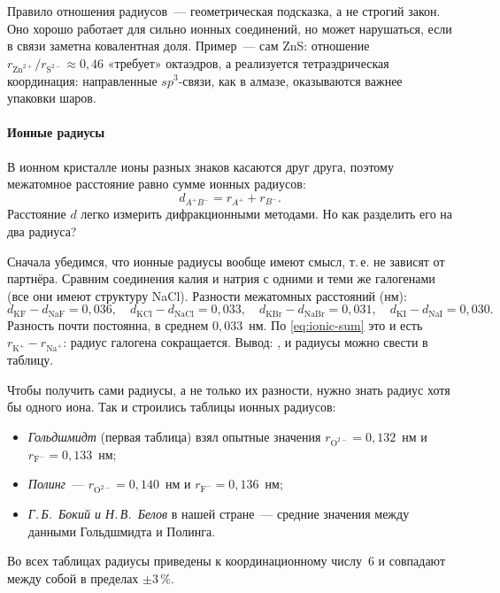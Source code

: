 \begin{vnimanie}
Правило отношения радиусов~— геометрическая подсказка, а не строгий закон.
Оно хорошо работает для сильно ионных соединений, но может нарушаться,
если в связи заметна ковалентная доля. Пример~— сам ZnS: отношение
$r_{\text{Zn}^{2+}}/r_{\text{S}^{2-}}\approx0{,}46$ «требует»
октаэдров, а реализуется тетраэдрическая координация: направленные
$sp^3$-связи, как в алмазе, оказываются важнее упаковки шаров.
\end{vnimanie}

\paragraph{Ионные радиусы}
В ионном кристалле ионы разных знаков касаются друг друга, поэтому
межатомное расстояние равно сумме ионных радиусов:
\begin{equation}\label{eq:ionic-sum}
d_{A^+B^-}=r_{A^+}+r_{B^-} .
\end{equation}
Расстояние $d$ легко измерить дифракционными методами. Но как разделить
его на два радиуса?

Сначала убедимся, что ионные радиусы вообще имеют смысл, т.\,е. не
зависят от партнёра. Сравним соединения калия и натрия с одними и теми
же галогенами (все они имеют структуру NaCl). Разности межатомных
расстояний (нм):
\[
d_\text{KF}-d_\text{NaF}=0{,}036,\quad d_\text{KCl}-d_\text{NaCl}=0{,}033,\quad
d_\text{KBr}-d_\text{NaBr}=0{,}031,\quad d_\text{KI}-d_\text{NaI}=0{,}030 .
\]
Разность почти постоянна, в среднем $0{,}033$~нм. По
\eqref{eq:ionic-sum} это и есть $r_{\text{K}^+}-r_{\text{Na}^+}$: радиус
галогена сокращается. Вывод: , и радиусы
можно свести в таблицу.

Чтобы получить сами радиусы, а не только их разности, нужно знать радиус
хотя бы одного иона. Так и строились таблицы ионных радиусов:
\begin{itemize}
\item \emph{Гольдшмидт} (первая таблица) взял опытные значения
$r_{\text{O}^{2-}}=0{,}132$~нм и $r_{\text{F}^-}=0{,}133$~нм;
\item \emph{Полинг}~— $r_{\text{O}^{2-}}=0{,}140$~нм и $r_{\text{F}^-}=0{,}136$~нм;
\item \emph{Г.\,Б.~Бокий и Н.\,В.~Белов} в нашей стране~— средние значения
между данными Гольдшмидта и Полинга.
\end{itemize}
Во всех таблицах радиусы приведены к координационному числу~6 и совпадают
между собой в пределах $\pm3$\,\%.

